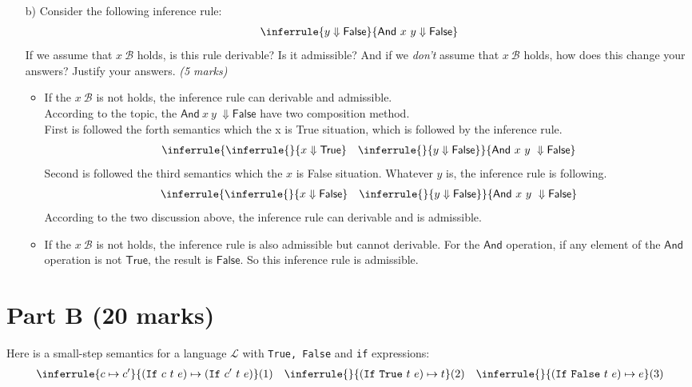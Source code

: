 \documentclass[a4paper,answers]{exam}
\begin{document}
\begin{itemize}
\begin{itemize}
\item[b)] Consider the following inference rule:
\begin{gather*}             
\inferrule{ y \Downarrow \mathsf{False } }{\mathsf{And}\ x\ y \Downarrow \mathsf{False}}
\end{gather*}
If we assume that $x\ \mathcal{B}$ holds, is this rule derivable? Is it admissible? And if we \textit{don't} assume that $x\ \mathcal{B}$ holds, how does this change your answers? Justify your answers. \textit{(5 marks)}

\begin{solution}
\begin{itemize}
    \item \small If the $x\ \mathcal{B}$ is not holds, the inference rule can derivable and admissible.\\[0.5em]
According to the topic, the $\mathsf{And}\ x\ y\ \Downarrow \mathsf{False}$ have two composition method.\\[0.5em]
First is followed the forth semantics which the x is \textsf{True} situation, which is followed by the inference rule.
\begin{gather*}
    \normalsize\inferrule{\inferrule{ }{x \Downarrow \mathsf{True}}\quad \inferrule{ }{y \Downarrow \mathsf{False}}}{\mathsf{And}\ x\ y\ \Downarrow \mathsf{False}}
\end{gather*}
\small Second is followed the third semantics which the $x$ is \textsf{False} situation. Whatever $y$ is, the inference rule is following.
\begin{gather*}
    \normalsize\inferrule{\inferrule{ }{x \Downarrow \mathsf{False}}\quad \inferrule{ }{y \Downarrow \mathsf{False}}}{\mathsf{And}\ x\ y\ \Downarrow \mathsf{False}}
\end{gather*}
\small According to the two discussion above, the inference rule can derivable and is admissible.
    \item If the $x\ \mathcal{B}$ is not holds, the inference rule is also admissible but cannot derivable. For the $\mathsf{And}$ operation, if any element of the $\mathsf{And}$ operation is not $\mathsf{True}$, the result is $\mathsf{False}$. So this inference rule is admissible.\\
\end{itemize}
\end{solution}
\end{itemize}
\end{itemize}

\newpage
\section*{Part B (20 marks)}
\noindent Here is a small-step semantics for a language $\mathcal{L}$ with \texttt{True, False} and \texttt{if} expressions:
\begin{gather*}
    \inferrule{ c \mapsto c' }{(\texttt{If}\ c\ t\ e) \mapsto (\texttt{If}\ c'\ t\ e) }(1)\quad
    \inferrule{ }{(\texttt{If}\ \texttt{True}\ t\ e) \mapsto t }(2)\quad
    \inferrule{ }{(\texttt{If}\ \texttt{False}\ t\ e) \mapsto e }(3)
\end{gather*}
\end{document}
